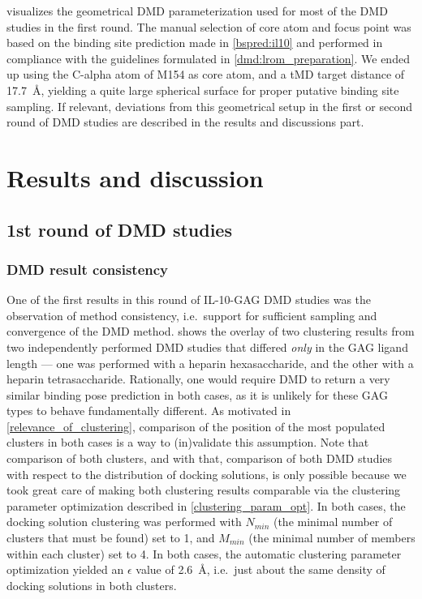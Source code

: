  visualizes the geometrical DMD
parameterization used for most of the DMD studies in the first round. The manual
selection of core atom and focus point was based on the binding site prediction
made in \cref{bspred:il10} and performed in compliance with the guidelines
formulated in \cref{dmd:lrom_preparation}. We ended up using the C-alpha atom of
M154 as core atom, and a tMD target distance of \SI{17.7}{\angstrom}, yielding a
quite large spherical surface for proper putative binding site sampling. If
relevant, deviations from this geometrical setup in the first or second round of
DMD studies are described in the results and discussions part.


\section{Results and discussion}

\subsection{1st round of DMD studies}

\subsubsection{DMD result consistency}

One of the first results in this round of IL-10-GAG DMD studies was the
observation of method consistency, i.e.\ support for sufficient sampling and
convergence of the DMD method.
 shows the overlay
of two clustering results from two independently performed DMD studies that
differed \textit{only} in the GAG ligand length --- one was performed with a
heparin hexasaccharide, and the other with a heparin tetrasaccharide.
Rationally, one would require DMD to return a very similar binding pose
prediction in both cases, as it is unlikely for these GAG types to behave
fundamentally different. As motivated in \cref{relevance_of_clustering},
comparison of the position of the most populated clusters in both cases is a way
to (in)validate this assumption. Note that comparison of both clusters, and with
that, comparison of both DMD studies with respect to the distribution of docking
solutions, is only possible because we took great care of making both clustering
results comparable via the clustering parameter optimization described in
\cref{clustering_param_opt}. In both cases, the docking solution clustering was
performed with $N_{min}$ (the minimal number of clusters that must be found) set
to 1, and $M_{min}$ (the minimal number of members within each cluster) set to
4. In both cases, the automatic clustering parameter optimization yielded an
   $\epsilon$ value of \SI{2.6}{\angstrom}, i.e.\ just about the same density of
   docking solutions in both clusters.

